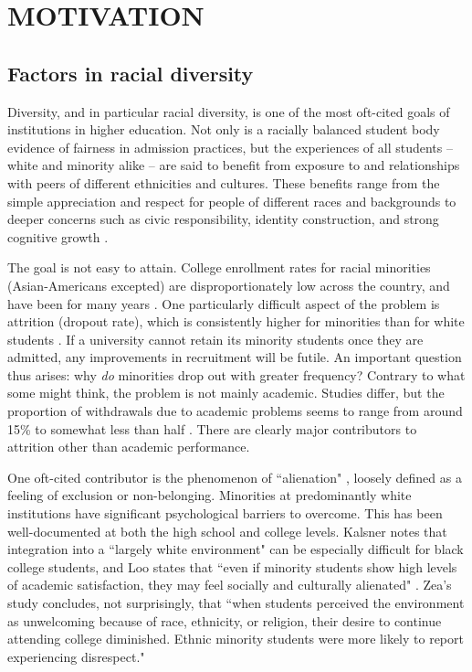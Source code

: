 \section{MOTIVATION}
\label{sec:intro}

\subsection{Factors in racial diversity}

Diversity, and in particular racial diversity, is one of the most oft-cited
goals of institutions in higher education. Not only is a racially balanced
student body evidence of fairness in admission practices, but the experiences
of all students -- white and minority alike -- are said to benefit from
exposure to and relationships with peers of different ethnicities and
cultures. These benefits range from the simple appreciation and respect for
people of different races and backgrounds to deeper concerns such as civic
responsibility, identity construction, and strong cognitive
growth \cite{gurin_diversity_2002}.

The goal is not easy to attain. College enrollment rates for racial minorities
(Asian-Americans excepted) are disproportionately low across the country, and
have been for many years \cite{ryu_minorities_2010}. One particularly difficult
aspect of the problem is attrition (dropout rate), which is consistently
higher for minorities than for white students \cite{zea_predicting_1997}. If a
university cannot retain its minority students once they are admitted, any
improvements in recruitment will be futile. An important question thus
arises: why \textit{do} minorities drop out with greater frequency? Contrary
to what some might think, the problem is not mainly academic. Studies differ,
but the proportion of withdrawals due to academic problems seems to range from
around 15\% \cite{kalsner_issues_1991} to somewhat less than
half \cite{suen_alienation_1983}. There are clearly major contributors to
attrition other than academic performance.

One oft-cited contributor is the phenomenon of ``alienation"
\cite{burbach_development_1972,dean_alienation:_1961}, loosely defined as a
feeling of exclusion or non-belonging. Minorities at predominantly white
institutions have significant psychological barriers to overcome. This has
been well-documented at both the high school \cite{calabrese_structure_1988}
and college \cite{nora_role_1996} levels. Kalsner notes that integration into
a ``largely white environment" can be especially difficult for black college
students, and Loo states that ``even if minority students show high levels of
academic satisfaction, they may feel socially and culturally alienated"
\cite{loo_alienation_1986}. Zea's study concludes, not surprisingly, that
``when students perceived the environment as unwelcoming because of race,
ethnicity, or religion, their desire to continue attending college diminished.
Ethnic minority students were more likely to report experiencing disrespect."
\cite{zea_predicting_1997}

